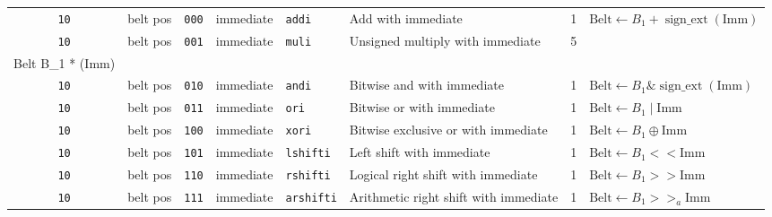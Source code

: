 \documentclass{article}
\begin{document}
\begin{landscape}
\begin{longtable}{c c c c l l c l}
		\texttt{10} & belt pos & \texttt{000} & immediate & \texttt{addi}     & Add with immediate                    & 1 &
			\(\textrm{Belt} \gets B_1 + \operatorname{sign\_ext}\left(\textrm{Imm}\right)\) \\
		\texttt{10} & belt pos & \texttt{001} & immediate & \texttt{muli}     & Unsigned multiply with immediate      & 5 &
			\(\begin{array}{l}
				\textrm{Belt} \gets \left(B_1 * \operatorname{sign\_ext}\left(\textrm{Imm}\right)\right) << 16, \\
				\textrm{Belt} \gets B_1 * \operatorname{sign\_ext}\left(\textrm{Imm}\right)
			\end{array}\) \\
		\texttt{10} & belt pos & \texttt{010} & immediate & \texttt{andi}     & Bitwise and with immediate            & 1 &
			\(\textrm{Belt} \gets B_1 \mathop{\&} \operatorname{sign\_ext}\left(\textrm{Imm}\right)\) \\
		\texttt{10} & belt pos & \texttt{011} & immediate & \texttt{ori}      & Bitwise or with immediate             & 1 &
			\(\textrm{Belt} \gets B_1 \mathop{|} \textrm{Imm}\) \\
		\texttt{10} & belt pos & \texttt{100} & immediate & \texttt{xori}     & Bitwise exclusive or with immediate   & 1 &
			\(\textrm{Belt} \gets B_1 \oplus \textrm{Imm}\) \\
		\texttt{10} & belt pos & \texttt{101} & immediate & \texttt{lshifti}  & Left shift with immediate             & 1 &
			\(\textrm{Belt} \gets B_1 << \textrm{Imm}\) \\
		\texttt{10} & belt pos & \texttt{110} & immediate & \texttt{rshifti}  & Logical right shift with immediate    & 1 &
			\(\textrm{Belt} \gets B_1 >> \textrm{Imm}\) \\
		\texttt{10} & belt pos & \texttt{111} & immediate & \texttt{arshifti} & Arithmetic right shift with immediate & 1 &
			\(\textrm{Belt} \gets B_1 >>_a \textrm{Imm}\) \\


\end{longtable}
\end{landscape}
\end{document}
